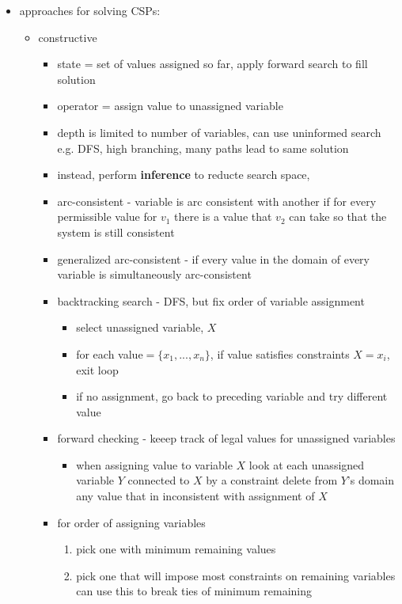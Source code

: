 \documentclass[11pt]{article}
\newcommand{\ee}[1]{\ensuremath{#1}}
\begin{document}
\begin{description}
\begin{itemize}
	\item approaches for solving CSPs:
	\begin{itemize}
		\item constructive
		\begin{itemize}
			\item state = set of values assigned so far, apply forward search to fill solution
			\item operator = assign value to unassigned variable
			\item depth is limited to number of variables, can use uninformed search e.g. DFS, high branching, many paths lead to same solution
			\item instead, perform \textbf{inference} to reducte search space,
			\item arc-consistent - variable is arc consistent with another if for every permissible value for \ee{v_1} there is a value that \ee{v_2} can take so that the system is still consistent 
			\item generalized arc-consistent - if every value in the domain of every variable is simultaneously arc-consistent
			\item backtracking search - DFS, but fix order of variable assignment
			\begin{itemize}
				\item select unassigned variable, \ee{X}
				\item for each value\ee{=\{x_1,...,x_n\}},
				\subitem if value satisfies constraints \ee{X = x_i}, exit loop
				\item if no assignment, go back to preceding variable and try different value
			\end{itemize}
			\item forward checking - keeep track of legal values for unassigned variables
			\begin{itemize}
				\item when assigning value to variable \ee{X}
				\subitem look at each unassigned variable \ee{Y} connected to \ee{X} by a constraint
				\subitem delete from \ee{Y}'s domain any value that in inconsistent with assignment of \ee{X}
			\end{itemize}
			\item for order of assigning variables
			\begin{enumerate}
				\item pick one with minimum remaining values
				\item pick one that will impose most constraints on remaining variables
				\subitem can use this to break ties of minimum remaining
			\end{enumerate}
		\end{itemize}
	

\end{itemize}
\end{itemize}
\end{description}
\end{document}
